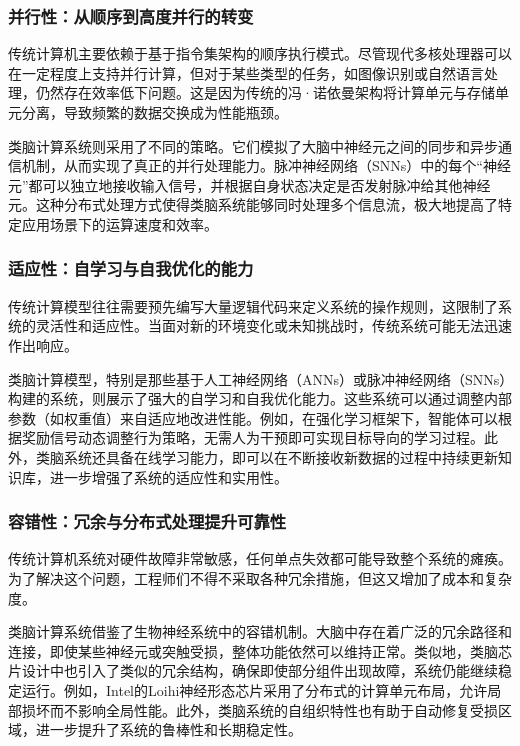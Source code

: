 \documentclass[a4paper,12pt]{article}
\begin{document}
\subsubsection{并行性：从顺序到高度并行的转变}

传统计算机主要依赖于基于指令集架构的顺序执行模式。尽管现代多核处理器可以在一定程度上支持并行计算，但对于某些类型的任务，如图像识别或自然语言处理，仍然存在效率低下问题。这是因为传统的冯·诺依曼架构将计算单元与存储单元分离，导致频繁的数据交换成为性能瓶颈。

类脑计算系统则采用了不同的策略。它们模拟了大脑中神经元之间的同步和异步通信机制，从而实现了真正的并行处理能力。脉冲神经网络（SNNs）中的每个“神经元”都可以独立地接收输入信号，并根据自身状态决定是否发射脉冲给其他神经元。这种分布式处理方式使得类脑系统能够同时处理多个信息流，极大地提高了特定应用场景下的运算速度和效率\cite{bohte2012spiking}。

\subsubsection{适应性：自学习与自我优化的能力}

传统计算模型往往需要预先编写大量逻辑代码来定义系统的操作规则，这限制了系统的灵活性和适应性。当面对新的环境变化或未知挑战时，传统系统可能无法迅速作出响应。

类脑计算模型，特别是那些基于人工神经网络（ANNs）或脉冲神经网络（SNNs）构建的系统，则展示了强大的自学习和自我优化能力。这些系统可以通过调整内部参数（如权重值）来自适应地改进性能。例如，在强化学习框架下，智能体可以根据奖励信号动态调整行为策略，无需人为干预即可实现目标导向的学习过程\cite{sutton2018reinforcement}。此外，类脑系统还具备在线学习能力，即可以在不断接收新数据的过程中持续更新知识库，进一步增强了系统的适应性和实用性。

\subsubsection{容错性：冗余与分布式处理提升可靠性}

传统计算机系统对硬件故障非常敏感，任何单点失效都可能导致整个系统的瘫痪。为了解决这个问题，工程师们不得不采取各种冗余措施，但这又增加了成本和复杂度。

类脑计算系统借鉴了生物神经系统中的容错机制。大脑中存在着广泛的冗余路径和连接，即使某些神经元或突触受损，整体功能依然可以维持正常。类似地，类脑芯片设计中也引入了类似的冗余结构，确保即使部分组件出现故障，系统仍能继续稳定运行。例如，Intel的Loihi神经形态芯片采用了分布式的计算单元布局，允许局部损坏而不影响全局性能\cite{davies2018loihi}。此外，类脑系统的自组织特性也有助于自动修复受损区域，进一步提升了系统的鲁棒性和长期稳定性。
\end{document}
